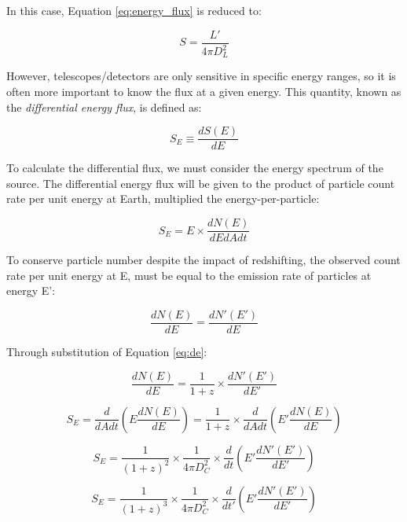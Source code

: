 In this case, Equation \ref{eq:energy_flux} is reduced to:

\begin{equation}
S = \frac{L'}{4 \pi D_{L}^{2}}
\end{equation}

However, telescopes/detectors are only sensitive in specific energy ranges, so it is often more important to know the flux at a given energy. This quantity, known as the \emph{differential energy flux}, is defined as:

\begin{equation}
S_{E} \equiv \frac{dS(E)}{dE}
\end{equation}

To calculate the differential flux, we must consider the energy spectrum of the source. The differential energy flux will be given to the product of particle count rate per unit energy at Earth, multiplied the energy-per-particle:

\begin{equation}
S_{E} = E \times \frac{dN(E)}{dEdAdt}
\end{equation}

To conserve particle number despite the impact of redshifting, the observed count rate per unit energy at E, must be equal to the emission rate of particles at energy E':

\begin{equation}
\frac{dN(E)}{dE}= \frac{dN'(E')}{dE}
\end{equation}

Through substitution of Equation \ref{eq:de}:

\begin{equation}
\frac{dN(E)}{dE}= \frac{1}{1+z} \times \frac{dN'(E')}{dE'}
\end{equation}

\begin{equation}
S_{E} = \frac{d}{dAdt} \left( E \frac{dN(E)}{dE} \right)= \frac{1}{1+z} \times \frac{d}{dAdt} \left( E' \frac{dN(E)}{dE} \right)
\end{equation}

\begin{equation}
S_{E} = \frac{1}{(1+z)^{2}} \times \frac{1}{4 \pi D_{C}^{2}} \times \frac{d}{dt} \left( E' \frac{dN'(E')}{dE'} \right)
\end{equation}

\begin{equation}
S_{E} = \frac{1}{(1+z)^{3}} \times \frac{1}{4 \pi D_{C}^{2}} \times \frac{d}{dt'} \left( E' \frac{dN'(E')}{dE'} \right)
\end{equation}

